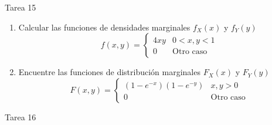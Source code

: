 \documentclass[a4paper, 12pt]{article}
\newcommand{\Aspace}{0.2cm}
\begin{document}
    \newpage
    \vspace{0.3cm}

    \begin{center}
        { \LARGE Tarea 15}
    \end{center}

    \begin{enumerate}
        \item Calcular las funciones de densidades marginales $f_{X}(x)$ y $f_{Y}(y)$
        \[
            f(x, y) =
            \begin{cases}
                4xy     &   0 < x, y < 1    \\
                0       &   \text{Otro caso}
            \end{cases}
        \]
            \vspace{\Aspace}
            { \color{azul}  }
        

        \item Encuentre las funciones de distribución marginales $F_{X}(x)$ y $F_{Y}(y)$
        \[
            F(x, y) =
            \begin{cases}
                (1 - e^{-x})(1 - e^{-y})    &   x, y > 0    \\
                0                           &   \text{Otro caso}
            \end{cases}
        \]
            \vspace{\Aspace}
            { \color{azul}  }
    \end{enumerate}



    \newpage
    \vspace{0.3cm}

    \begin{center}
        { \LARGE Tarea 16}
    \end{center}
\end{document}
